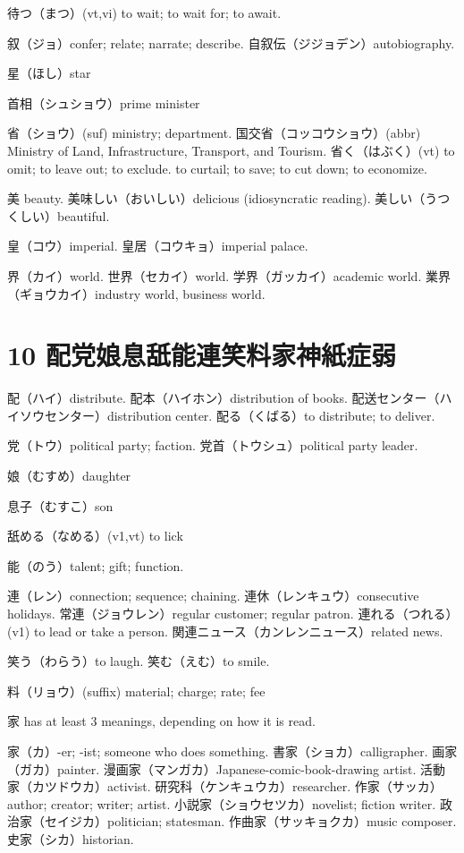 待つ（まつ）(vt,vi) to wait; to wait for; to await.

叙（ジョ）confer; relate; narrate; describe.
自叙伝（ジジョデン）autobiography.

星（ほし）star

首相（シュショウ）prime minister

省（ショウ）(suf) ministry; department.
国交省（コッコウショウ）(abbr)
Ministry of Land, Infrastructure, Transport, and Tourism.
省く（はぶく）(vt)
to omit; to leave out; to exclude.
to curtail; to save; to cut down; to economize.

美 beauty.
美味しい（おいしい）delicious (idiosyncratic reading).
美しい（うつくしい）beautiful.

皇（コウ）imperial.
皇居（コウキョ）imperial palace.

界（カイ）world.
世界（セカイ）world.
学界（ガッカイ）academic world.
業界（ギョウカイ）industry world, business world.

\section{10 配党娘息舐能連笑料家神紙症弱}

配（ハイ）distribute.
配本（ハイホン）distribution of books.
配送センター（ハイソウセンター）distribution center.
配る（くばる）to distribute; to deliver.

党（トウ）political party; faction.
党首（トウシュ）political party leader.

娘（むすめ）daughter

息子（むすこ）son

舐める（なめる）(v1,vt) to lick

能（のう）talent; gift; function.

連（レン）connection; sequence; chaining.
連休（レンキュウ）consecutive holidays.
常連（ジョウレン）regular customer; regular patron.
連れる（つれる）(v1) to lead or take a person.
関連ニュース（カンレンニュース）related news.

笑う（わらう）to laugh.
笑む（えむ）to smile.

料（リョウ）(suffix) material; charge; rate; fee

家 has at least 3 meanings, depending on how it is read.

家（カ）-er; -ist; someone who does something.
書家（ショカ）calligrapher.
画家（ガカ）painter.
漫画家（マンガカ）Japanese-comic-book-drawing artist.
活動家（カツドウカ）activist.
研究科（ケンキュウカ）researcher.
作家（サッカ）author; creator; writer; artist.
小説家（ショウセツカ）novelist; fiction writer.
政治家（セイジカ）politician; statesman.
作曲家（サッキョクカ）music composer.
史家（シカ）historian.

